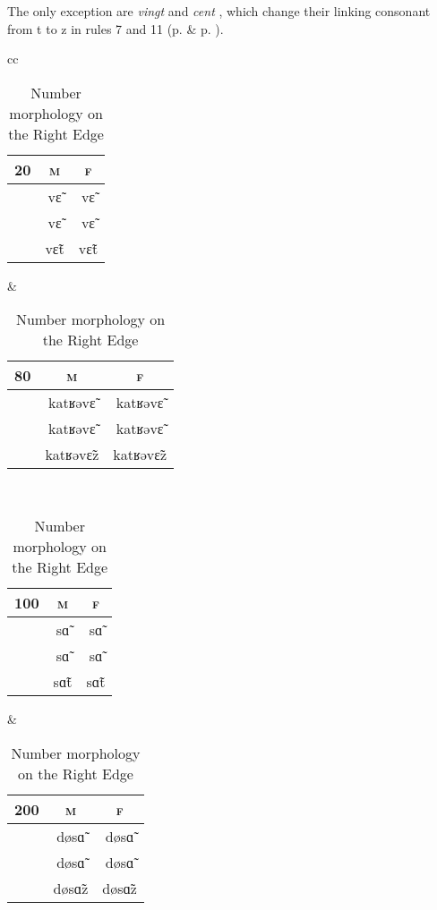 \documentclass[output=paper]{langsci/langscibook}
\begin{document}
The only exception are \emph{vingt}  and \emph{cent} , which change their linking consonant from t %
 to z %
 in rules 7 and 11 (p. \pageref{2D-Rules} \& p. \pageref{numRules}).
\begin{table}

\begin{tabular}{cc}
\lsptoprule
\begin{tabular}{rcc}
20& \textsc{m} & \textsc{f} \\
\midrule
\lmoins & vɛ̃ %
&vɛ̃ %
 \\
\lpause &vɛ̃ %
 &vɛ̃ %
 \\
\lplus & vɛ̃t %
  & vɛ̃t %
 \\
\end{tabular}
&
\begin{tabular}{rcc}
80& \textsc{m} & \textsc{f} \\
\midrule
\lmoins & katʁəvɛ̃ %
&katʁəvɛ̃ %
 \\
\lpause &katʁəvɛ̃ %
 &katʁəvɛ̃ %
 \\
\lplus & katʁəvɛ̃z %
  & katʁəvɛ̃z %
\\
\end{tabular}\\
\tablevspace
\begin{tabular}{rcc}
100& \textsc{m} & \textsc{f} \\
\midrule
\lmoins & sɑ̃ %
&sɑ̃ %
 \\
\lpause &sɑ̃ %
 &sɑ̃ %
 \\
\lplus & sɑ̃t %
  & sɑ̃t %
 \\
\end{tabular}
&
\begin{tabular}{rcc}
200& \textsc{m} & \textsc{f} \\
\midrule
\lmoins & døsɑ̃ %
&døsɑ̃ %
 \\
\lpause &døsɑ̃ %
 &døsɑ̃ %
 \\
\lplus & døsɑ̃z %
  & døsɑ̃z %
\\
\end{tabular}\\
\lspbottomrule
\end{tabular}
\caption{Number morphology on the Right Edge}
\label{numMor}
\end{table}%
\end{document}
